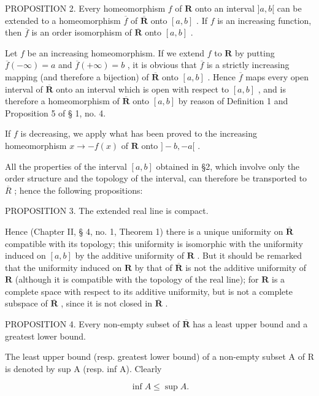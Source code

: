 PROPOSITION 2. Every homeomorphism \(f\) of \(\mathbf{R}\) onto an interval \(]a, b[\) can be extended to a homeomorphism \(\overline{f}\) of \(\overline{\mathbf{R}}\) onto \([a, b]\) . If \(f\) is an increasing function, then \(\overline{f}\) is an order isomorphism of \(\overline{\mathbf{R}}\) onto \([a, b]\) .

Let \(f\) be an increasing homeomorphism. If we extend \(f\) to \(\mathbf{R}\) by putting \(\overline{f}(-\infty) = a\) and \(\overline{f}(+\infty) = b\) , it is obvious that \(\overline{f}\) is a strictly increasing mapping (and therefore a bijection) of \(\overline{\mathbf{R}}\) onto \([a, b]\) . Hence \(\overline{f}\) maps every open interval of \(\overline{\mathbf{R}}\) onto an interval which is open with respect to \([a, b]\) , and is therefore a homeomorphism of \(\overline{\mathbf{R}}\) onto \([a, b]\) by reason of Definition 1 and Proposition 5 of § 1, no. 4.

If \(f\) is decreasing, we apply what has been proved to the increasing homeomorphism \(x \to -f(x)\) of \(\mathbf{R}\) onto \(] - b, - a[\) .

All the properties of the interval \([a, b]\) obtained in §2, which involve only the order structure and the topology of the interval, can therefore be transported to \(\overline{R}\) ; hence the following propositions:

PROPOSITION 3. The extended real line is compact.

Hence (Chapter II, § 4, no. 1, Theorem 1) there is a unique uniformity on \(\overline{\mathbf{R}}\) compatible with its topology; this uniformity is isomorphic with the uniformity induced on \([a, b]\) by the additive uniformity of \(\mathbf{R}\) . But it should be remarked that the uniformity induced on \(\mathbf{R}\) by that of \(\overline{\mathbf{R}}\) is not the additive uniformity of \(\mathbf{R}\) (although it is compatible with the topology of the real line); for \(\mathbf{R}\) is a complete space with respect to its additive uniformity, but is not a complete subspace of \(\overline{\mathbf{R}}\) , since it is not closed in \(\overline{\mathbf{R}}\) .

PROPOSITION 4. Every non-empty subset of \(\overline{\mathbf{R}}\) has a least upper bound and a greatest lower bound.

The least upper bound (resp. greatest lower bound) of a non-empty subset A of R is denoted by sup A (resp. inf A). Clearly

\[
\inf A \leqslant \sup A.\tag{1}
\]


